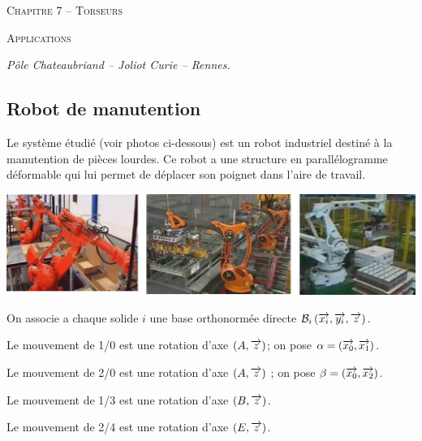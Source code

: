 \documentclass[10pt]{article}
\begin{document}

\begin{center}
\large{\textsc{Chapitre 7 -- Torseurs}}
\end{center}

\begin{center}
\textsc{Applications}
\end{center}

\normalsize

\begin{flushright}
\textit{Pôle Chateaubriand -- Joliot Curie -- Rennes.}
\end{flushright}

 \renewcommand{\baselinestretch}{1.2}




\subsection*{Robot de manutention}

Le système étudié (voir photos ci-dessous) est un robot industriel destiné à la manutention de
pièces lourdes. Ce robot a une structure en parallélogramme déformable qui lui permet de déplacer son poignet dans l’aire de travail.

\begin{center}
\includegraphics[width=.9\textwidth]{images/fig1}
\end{center}


On associe a chaque solide $i$ une base orthonormée directe $\mathcal{B}_i \left(\overrightarrow{x_i} ,\overrightarrow{y_i}, \overrightarrow{z}\right)$.

Le mouvement de 1/0 est une rotation d'axe $(A,\overrightarrow{z})$; on pose $\alpha= (\overrightarrow{x_0} , \overrightarrow{x_1})$.

Le mouvement de 2/0 est une rotation d'axe $(A,\overrightarrow{z})$ ; on pose $\beta= (\overrightarrow{x_0} , \overrightarrow{x_2})$.

Le mouvement de 1/3 est une rotation d'axe $(B,\overrightarrow{z})$.

Le mouvement de 2/4 est une rotation d'axe $(E,\overrightarrow{z})$.
\end{document}
